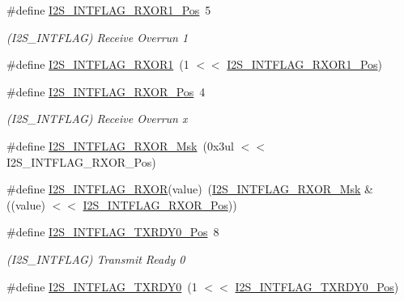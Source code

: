 \begin{DoxyCompactItemize}
\item 
\#define \mbox{\hyperlink{group___s_a_m_d21___i2_s_ga187192cb3469dd749d34479792551617}{I2\+S\+\_\+\+I\+N\+T\+F\+L\+A\+G\+\_\+\+R\+X\+O\+R1\+\_\+\+Pos}}~5
\begin{DoxyCompactList}\small\item\em (I2\+S\+\_\+\+I\+N\+T\+F\+L\+AG) Receive Overrun 1 \end{DoxyCompactList}\item 
\#define \mbox{\hyperlink{group___s_a_m_d21___i2_s_gaa9d19afa1900eddcd502f9d87e3ee835}{I2\+S\+\_\+\+I\+N\+T\+F\+L\+A\+G\+\_\+\+R\+X\+O\+R1}}~(1 $<$$<$ \mbox{\hyperlink{group___s_a_m_d21___i2_s_ga187192cb3469dd749d34479792551617}{I2\+S\+\_\+\+I\+N\+T\+F\+L\+A\+G\+\_\+\+R\+X\+O\+R1\+\_\+\+Pos}})
\item 
\#define \mbox{\hyperlink{group___s_a_m_d21___i2_s_ga72a2ee346cab69a89d41a362304e67a8}{I2\+S\+\_\+\+I\+N\+T\+F\+L\+A\+G\+\_\+\+R\+X\+O\+R\+\_\+\+Pos}}~4
\begin{DoxyCompactList}\small\item\em (I2\+S\+\_\+\+I\+N\+T\+F\+L\+AG) Receive Overrun x \end{DoxyCompactList}\item 
\#define \mbox{\hyperlink{group___s_a_m_d21___i2_s_ga414752427244b650e65ac321ecb3135e}{I2\+S\+\_\+\+I\+N\+T\+F\+L\+A\+G\+\_\+\+R\+X\+O\+R\+\_\+\+Msk}}~(0x3ul $<$$<$ I2\+S\+\_\+\+I\+N\+T\+F\+L\+A\+G\+\_\+\+R\+X\+O\+R\+\_\+\+Pos)
\item 
\#define \mbox{\hyperlink{group___s_a_m_d21___i2_s_ga1a5e3318f41880a021fe5b5dfd396d52}{I2\+S\+\_\+\+I\+N\+T\+F\+L\+A\+G\+\_\+\+R\+X\+OR}}(value)~(\mbox{\hyperlink{group___s_a_m_d21___i2_s_ga414752427244b650e65ac321ecb3135e}{I2\+S\+\_\+\+I\+N\+T\+F\+L\+A\+G\+\_\+\+R\+X\+O\+R\+\_\+\+Msk}} \& ((value) $<$$<$ \mbox{\hyperlink{group___s_a_m_d21___i2_s_ga72a2ee346cab69a89d41a362304e67a8}{I2\+S\+\_\+\+I\+N\+T\+F\+L\+A\+G\+\_\+\+R\+X\+O\+R\+\_\+\+Pos}}))
\item 
\#define \mbox{\hyperlink{group___s_a_m_d21___i2_s_gab8cb5231618dcbf1dc0755bef513fcbb}{I2\+S\+\_\+\+I\+N\+T\+F\+L\+A\+G\+\_\+\+T\+X\+R\+D\+Y0\+\_\+\+Pos}}~8
\begin{DoxyCompactList}\small\item\em (I2\+S\+\_\+\+I\+N\+T\+F\+L\+AG) Transmit Ready 0 \end{DoxyCompactList}\item 
\#define \mbox{\hyperlink{group___s_a_m_d21___i2_s_ga7a16e807db956dac69978175034668e8}{I2\+S\+\_\+\+I\+N\+T\+F\+L\+A\+G\+\_\+\+T\+X\+R\+D\+Y0}}~(1 $<$$<$ \mbox{\hyperlink{group___s_a_m_d21___i2_s_gab8cb5231618dcbf1dc0755bef513fcbb}{I2\+S\+\_\+\+I\+N\+T\+F\+L\+A\+G\+\_\+\+T\+X\+R\+D\+Y0\+\_\+\+Pos}})

\end{DoxyCompactItemize}
